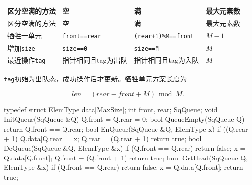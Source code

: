 \par\smallskip
\begin{wideblock}
{\fontsize{9.3}{12}\selectfont\setlength{\tabcolsep}{2.5pt}\setlength{\LTleft}{0pt}\setlength{\LTright}{0pt}
\begin{longtable}{@{}>{\raggedright\arraybackslash}p{}>{\raggedright\arraybackslash}p{}>{\raggedright\arraybackslash}p{}>{\raggedright\arraybackslash}p{}@{}}
\toprule
区分空满的方法 & 空 & 满 & 最大元素数 \\

\midrule\endfirsthead\toprule
区分空满的方法 & 空 & 满 & 最大元素数 \\

\midrule\endhead\bottomrule\endfoot
牺牲一单元 & \texttt{front==rear} & \texttt{(rear+1)\%M==front} & \(M-1\) \\

增加\texttt{size} & \texttt{size==0} & \texttt{size==M} & \(M\) \\

最近操作\texttt{tag} & 指针相同且tag为出队 & 指针相同且tag为入队 & \(M\) \\

\end{longtable}}
\end{wideblock}
\par\smallskip

\texttt{tag}初始为出队态，成功操作后才更新。牺牲单元方案长度为

\[len=(rear-front+M)\bmod M.\]

\par\smallskip\noindent\begin{minipage}{\linewidth}
\begin{codeblock}[language={C++}]
typedef struct {
    ElemType data[MaxSize];
    int front, rear;
} SqQueue;
void InitQueue(SqQueue &Q) { Q.front = Q.rear = 0; }
bool QueueEmpty(SqQueue Q) { return Q.front == Q.rear; }
bool EnQueue(SqQueue &Q, ElemType x) {
    if ((Q.rear + 1) %
    Q.data[Q.rear] = x;
    Q.rear = (Q.rear + 1) %
    return true;
}
bool DeQueue(SqQueue &Q, ElemType &x) {
    if (Q.front == Q.rear) return false;
    x = Q.data[Q.front];
    Q.front = (Q.front + 1) %
    return true;
}
bool GetHead(SqQueue Q, ElemType &x) {
    if (Q.front == Q.rear) return false;
    x = Q.data[Q.front];
    return true;
}
\end{codeblock}
\end{minipage}\par\smallskip

